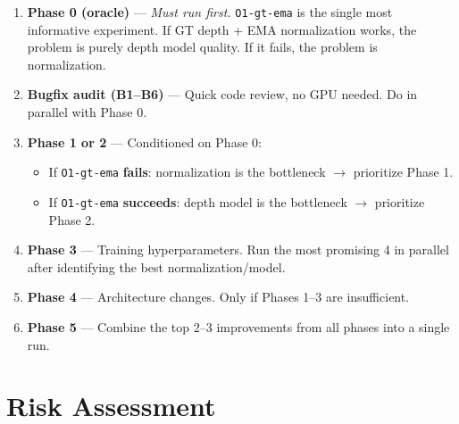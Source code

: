 \documentclass[11pt,a4paper]{article}
\begin{document}
\begin{enumerate}
  \item \textbf{Phase 0 (oracle)} --- \emph{Must run first.}
        \texttt{O1-gt-ema} is the single most informative experiment.
        If GT depth + EMA normalization works, the problem is purely depth
        model quality.  If it fails, the problem is normalization.

  \item \textbf{Bugfix audit (B1--B6)} --- Quick code review, no GPU needed.
        Do in parallel with Phase 0.

  \item \textbf{Phase 1 or 2} --- Conditioned on Phase 0:
    \begin{itemize}[nosep]
      \item If \texttt{O1-gt-ema} \textbf{fails}: normalization is the
            bottleneck $\to$ prioritize Phase 1.
      \item If \texttt{O1-gt-ema} \textbf{succeeds}: depth model is the
            bottleneck $\to$ prioritize Phase 2.
    \end{itemize}

  \item \textbf{Phase 3} --- Training hyperparameters.  Run the most
        promising 4 in parallel after identifying the best normalization/model.

  \item \textbf{Phase 4} --- Architecture changes.  Only if Phases 1--3
        are insufficient.

  \item \textbf{Phase 5} --- Combine the top 2--3 improvements from all
        phases into a single run.
\end{enumerate}

\section{Risk Assessment}
\end{document}
